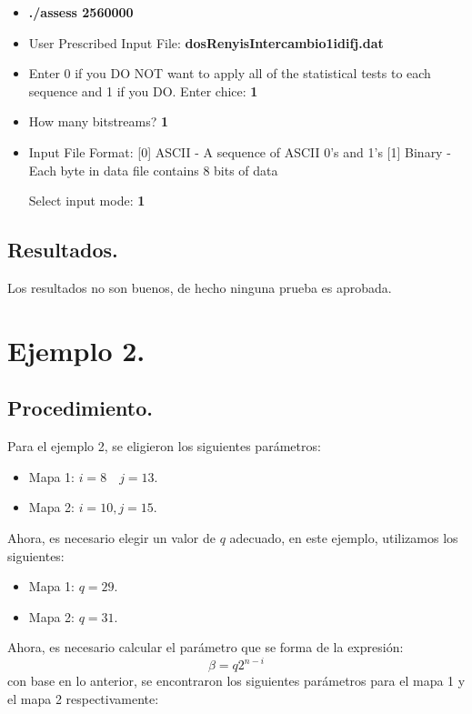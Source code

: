 \documentclass[10pt]{IEEEtran}
\begin{document}
\begin{itemize}
\item \textbf{./assess 2560000}
\item User Prescribed Input File: \textbf{dosRenyisIntercambio1idifj.dat}
\item    Enter 0 if you DO NOT want to apply all of the
         statistical tests to each sequence and 1 if you DO. Enter chice: \textbf{1}
                  
\item  How many bitstreams? \textbf{1}

\item Input File Format:
    [0] ASCII - A sequence of ASCII 0's and 1's
    [1] Binary - Each byte in data file contains 8 bits of data

   Select input mode:  \textbf{1}
\end{itemize}

\subsection{Resultados.}
Los resultados no son buenos, de hecho ninguna prueba es aprobada.


 
\section{Ejemplo 2.}

\subsection{Procedimiento.}
Para el ejemplo 2, se eligieron los siguientes parámetros:

\begin{itemize}
\item Mapa 1: $i = 8 \quad j = 13$.
\item Mapa 2: $i = 10, j = 15$.
\end{itemize}

Ahora, es necesario elegir un valor de $q$ adecuado, en este ejemplo, utilizamos los siguientes:

\begin{itemize}
\item Mapa 1: $q = 29$.
\item Mapa 2: $q = 31$.
\end{itemize}


Ahora, es necesario calcular el parámetro que se forma de la expresión:  
\begin{equation}
\beta = q 2^{n-i}
\end{equation}
con base en lo anterior, se encontraron los siguientes parámetros para el mapa 1 y el mapa 2 respectivamente:
\end{document}

